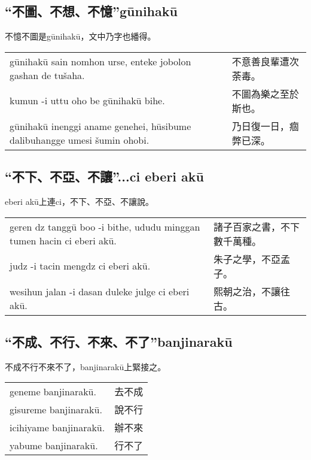 \documentclass{article}
\begin{document}
\subsection{“不圖、不想、不憶”g\={u}nihak\={u}}
\noindent 不憶不圖是g\={u}nihak\={u}，文中乃字也繙得。
\begin{center}
    \begin{tabularx}{\textwidth}{XX}
        g\={u}nihak\={u} sain nomhon urse, enteke jobolon gashan de tu\v{s}aha. & 不意善良輩遭次荼毒。\\
        kumun -i uttu oho be g\={u}nihak\={u} bihe. & 不圖為樂之至於斯也。\\
        g\={u}nihak\={u} inenggi aname genehei, h\={u}sibume dalibuhangge umesi \v{s}umin ohobi. & 乃日復一日，痼弊已深。
    \end{tabularx}
\end{center}

\subsection{“不下、不亞、不讓”...ci eberi ak\={u}}
\noindent eberi ak\={u}上連ci，不下、不亞、不讓說。
\begin{center}
    \begin{tabularx}{\textwidth}{XX}
        geren dz tangg\={u} boo -i bithe, ududu minggan tumen hacin ci eberi ak\={u}. & 諸子百家之書，不下數千萬種。\\
        judz -i tacin mengdz ci eberi ak\={u}. & 朱子之學，不亞孟子。\\
        wesihun jalan -i dasan duleke julge ci eberi ak\={u}. & 熙朝之治，不讓往古。
    \end{tabularx}
\end{center}

\subsection{“不成、不行、不來、不了”banjinarak\={u}}
\noindent 不成不行不來不了，banjinarak\={u}上緊接之。
\begin{center}
    \begin{tabularx}{\textwidth}{XX}
        geneme banjinarak\={u}. & 去不成\\
        gisureme banjinarak\={u}. & 說不行\\
        icihiyame banjinarak\={u}. & 辦不來\\
        yabume banjinarak\={u}. & 行不了
    \end{tabularx}
\end{center}
\end{document}
